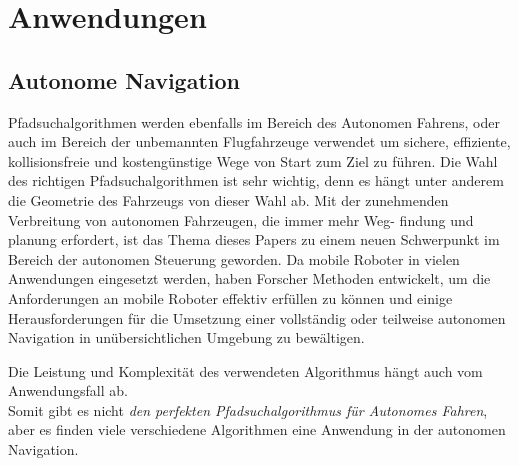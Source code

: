 \chapter{Anwendungen}
\label{Anwendungen}

\section{Autonome Navigation}
\label{Autonome Navigation}

Pfadsuchalgorithmen werden ebenfalls im Bereich des Autonomen Fahrens, oder auch im Bereich der unbemannten Flugfahrzeuge verwendet
um sichere, effiziente, kollisionsfreie und kostengünstige Wege von Start zum Ziel zu führen. Die Wahl des richtigen Pfadsuchalgorithmen
ist sehr wichtig, denn es hängt unter anderem die Geometrie des Fahrzeugs von dieser Wahl ab.
Mit der zunehmenden Verbreitung von autonomen Fahrzeugen, die immer mehr Weg- findung und planung erfordert, ist das Thema dieses Papers 
zu einem neuen Schwerpunkt im Bereich der autonomen Steuerung geworden.
Da mobile Roboter in vielen Anwendungen eingesetzt werden, haben Forscher Methoden entwickelt, um die 
Anforderungen an mobile Roboter effektiv erfüllen zu können und einige Herausforderungen für die Umsetzung einer vollständig oder
teilweise autonomen Navigation in unübersichtlichen Umgebung zu bewältigen.\cite{Karur:21}

Die Leistung und Komplexität des verwendeten Algorithmus hängt auch vom Anwendungsfall ab. \cite{Karur:21}\\
Somit gibt es nicht \emph{den perfekten Pfadsuchalgorithmus für Autonomes Fahren}, aber es finden viele verschiedene Algorithmen eine 
Anwendung in der autonomen Navigation.
